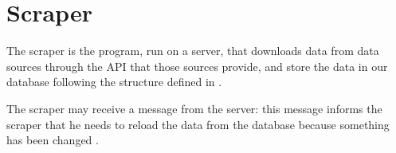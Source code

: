 \section{Scraper}\label{sec:scraper}

The scraper is the program, run on a server, that downloads data from data
sources  through the API that those sources
provide, and store the data in our database following the structure defined in
.

The scraper may receive a  message from the server: this message
informs the scraper that he needs to reload the data from the database because
something has been changed .
